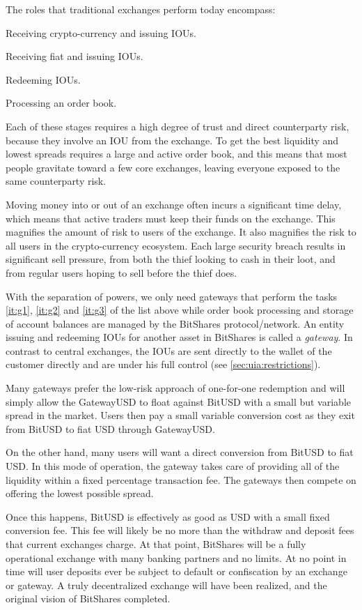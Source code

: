 \label{sec:gateway}

The roles that traditional exchanges perform today encompass:

\begin{compactenum}
 \item \label{it:g1} Receiving crypto-currency and issuing IOUs.
 \item \label{it:g2} Receiving fiat and issuing IOUs.
 \item \label{it:g3} Redeeming IOUs.
 \item \label{it:g4} Processing an order book.
\end{compactenum}

Each of these stages requires a high degree of trust and direct counterparty
risk, because they involve an IOU from the exchange. To get the best
liquidity and lowest spreads requires a large and active order book, and this
means that most people gravitate toward a few core exchanges, leaving everyone
exposed to the same counterparty risk.

Moving money into or out of an exchange often incurs a significant time delay,
which means that active traders must keep their funds on the exchange. This
magnifies the amount of risk to users of the exchange. It also magnifies the
risk to all users in the crypto-currency ecosystem. Each large security breach
results in significant sell pressure, from both the thief looking to cash in
their loot, and from regular users hoping to sell before the thief does.

\medskip

With the separation of powers, we only need gateways that perform the tasks
\ref{it:g1}, \ref{it:g2} and \ref{it:g3} of the list above while order book
processing and storage of account balances are managed by the BitShares
protocol/network. An entity issuing and redeeming IOUs for another asset in
BitShares is called a \emph{gateway}. In contrast to central exchanges, the
IOUs are sent directly to the wallet of the customer directly and are under his
full control (see \cref{sec:uia:restrictions}).

Many gateways prefer the low-risk approach of one-for-one redemption and will
simply allow the GatewayUSD to float against BitUSD with a small but variable
spread in the market. Users then pay a small variable conversion cost as they
exit from BitUSD to fiat USD through GatewayUSD.

On the other hand, many users will want a direct conversion from BitUSD to fiat
USD. In this mode of operation, the gateway takes care of providing all of the
liquidity within a fixed percentage transaction fee. The gateways then
compete on offering the lowest possible spread.

Once this happens, BitUSD is effectively as good as USD with a small fixed
conversion fee. This fee will likely be no more than the withdraw and deposit
fees that current exchanges charge. At that point, BitShares will be a fully
operational exchange with many banking partners and no limits. At no point in
time will user deposits ever be subject to default or confiscation by an
exchange or gateway. A truly decentralized exchange will have been realized,
and the original vision of BitShares completed.
